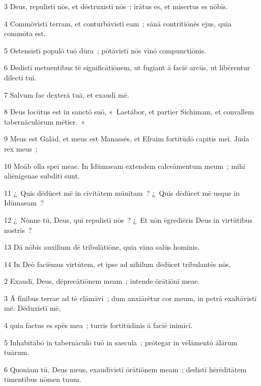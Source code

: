 \psalmVerse
  {\phantom{00}3}
  {Deus, repulistī nōs, et dēstruxistī nōs~; īrātus es, et misertus es nōbīs.}


\psalmVerse
  {\phantom{00}4}
  {Commōvistī terram, et conturbāvistī eam~; sānā contrītiōnēs ejus, quia commōta est.}


\psalmVerse
  {\phantom{00}5}
  {Ostensistī populō tuō dūra~; pōtāvistī nōs vīnō compunctiōnis.}


\psalmVerse
  {\phantom{00}6}
  {Dedistī metuentibus tē significātiōnem, ut fugiant ā faciē arcūs, ut libērentur dīlectī tuī.}


\psalmVerse
  {\phantom{00}7}
  {Salvum fac dexterā tuā, et exaudī mē.}


\psalmVerse
  {\phantom{00}8}
  {Deus locūtus est in sanctō suō, «~Laetābor, et partier Sichimam, et convallem tabernāculōrum mētier.~»}


\psalmVerse
  {\phantom{00}9}
  {Meus est Galād, et meus est Manassēs, et Efraim fortitūdō capitis meī. Jūda rex meus~;}


\psalmVerse
  {\phantom{0}10}
  {Moāb olla speī meae. In Idūmaeam extendem calceāmentum meum~; mihī aliēnigenae subditī sunt.}


\psalmVerse
  {\phantom{0}11}
  {¿~Quis dēdūcet mē in cīvitātem mūnītam~? ¿~Quis dēdūcet mē usque in Idūmaeam~?}


\psalmVerse
  {\phantom{0}12}
  {¿~Nōnne tū, Deus, quī repulistī nōs~? ¿~Et nōn ēgrediēris Deus in virtūtibus nostrīs~?}


\psalmVerse
  {\phantom{0}13}
  {Dā nōbīs auxilium dē trībulātiōne, quia vāna salūs hominis.}


\psalmVerse
  {\phantom{0}14}
  {In Deō faciēmus virtūtem, et ipse ad nihilum dēdūcet trībulantēs nōs.}



\psalmVerse
  {\phantom{00}2}
  {Exaudī, Deus, dēprecātiōnem meam~; intende ōrātiōnī meae.}


\psalmVerse
  {\phantom{00}3}
  {Ā fīnibus terrae ad tē clāmāvī~; dum anxiārētur cor meum, in petrā exaltāvistī mē. Dēduxistī mē,}


\psalmVerse
  {\phantom{00}4}
  {quia factus es spēs mea~; turris fortitūdinis ā faciē inimīcī.}


\psalmVerse
  {\phantom{00}5}
  {Inhabitābō in tabernāculō tuō in saecula~; prōtegar in vēlāmentō ālārum tuārum.}


\psalmVerse
  {\phantom{00}6}
  {Quoniam tū, Deus meus, exaudīvistī ōrātiōnem meam~; dedistī hērēditātem timentibus nōmen tuum.}


